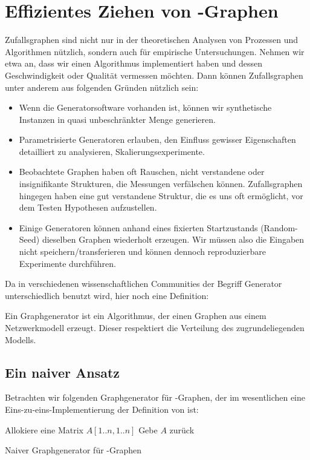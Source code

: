\section{Effizientes Ziehen von \Gnp-Graphen}
Zufallsgraphen sind nicht nur in der theoretischen Analysen von Prozessen und Algorithmen nützlich, sondern auch für empirische Untersuchungen.
Nehmen wir etwa an, dass wir einen Algorithmus implementiert haben und dessen Geschwindigkeit oder Qualität vermessen möchten.
Dann können Zufallsgraphen unter anderem aus folgenden Gründen nützlich sein:
\begin{itemize}
    \item Wenn die Generatorsoftware vorhanden ist, können wir synthetische Instanzen in quasi unbeschränkter Menge generieren.
    \item Parametrisierte Generatoren erlauben, den Einfluss gewisser Eigenschaften detailliert zu analysieren, \zB Skalierungsexperimente.
    \item Beobachtete Graphen haben oft \glqq Rauschen\grqq, \dh nicht verstandene oder insignifikante Strukturen, die Messungen verfälschen können.
          Zufallsgraphen hingegen haben \idR eine gut verstandene Struktur, die es uns oft ermöglicht, vor dem Testen Hypothesen aufzustellen.
    \item Einige Generatoren können anhand eines fixierten Startzustands (Random-Seed) dieselben Graphen wiederholt erzeugen.
          Wir müssen also die Eingaben nicht speichern/transferieren und können dennoch reproduzierbare Experimente durchführen.
\end{itemize}

\noindent Da in verschiedenen wissenschaftlichen Communities der Begriff \glqq Generator\grqq{} unterschiedlich benutzt wird, hier noch eine Definition:
\begin{definition}
    Ein  Graphgenerator ist ein Algorithmus, der einen Graphen aus einem Netzwerkmodell erzeugt.
    Dieser respektiert die Verteilung des zugrundeliegenden Modells.
\end{definition}

\subsection{Ein naiver Ansatz}
Betrachten wir folgenden Graphgenerator für \Gnp-Graphen, der im wesentlichen eine Eins-zu-eins-Implementierung der Definition von \Gnp ist:

\begin{algorithm}[H]
    Allokiere eine Matrix $A[1..n, 1..n]$\;
    Gebe $A$ zurück
    \caption{Naiver Graphgenerator für \Gnp-Graphen}
    \label{alg:naive-gnp}
\end{algorithm}

